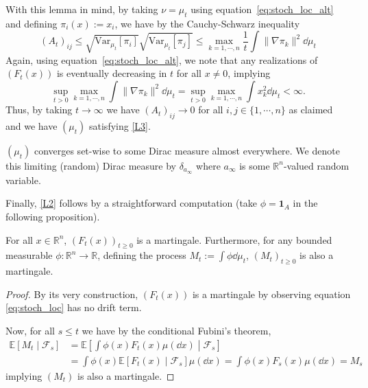 With this lemma in mind, by taking \(\nu = \mu_t\) using 
equation~\eqref{eq:stoch_loc_alt} and defining
\(\pi_i(x) := x_i\), we have by the Cauchy-Schwarz inequality
\[(A_t)_{ij} \le \sqrt{\text{Var}_{\mu_t}[\pi_i]}\sqrt{\text{Var}_{\mu_t}[\pi_j]} 
  \le \max_{k = 1, \cdots, n} \frac{1}{t}\int \|\nabla \pi_k\|^2 \dd \mu_t\]
Again, using equation~\eqref{eq:stoch_loc_alt}, we note that any realizations of \((F_t(x))\) is eventually 
decreasing in \(t\) for all \(x \neq 0\), implying 
\[\sup_{t > 0} \max_{k = 1, \cdots, n} \int \|\nabla \pi_k\|^2 \dd \mu_t = 
\sup_{t > 0} \max_{k = 1, \cdots, n} \int x_k^2 \dd \mu_t < \infty.\] 
Thus, by taking \(t \to \infty\) we have \((A_t)_{ij} \to 0\) for all \(i, j \in \{1, \cdots, n\}\) as claimed 
and we have \((\mu_t)\) satisfying \ref{L3}.

\begin{corollary}
  \((\mu_t)\) converges set-wise to some Dirac measure almost everywhere. We denote this 
  limiting (random) Dirac measure by \(\delta_{a_\infty}\) where \(a_\infty\) is some 
  \(\mathbb{R}^n\)-valued random variable.
\end{corollary}

Finally, \ref{L2} follows by a straightforward computation (take \(\phi = \mathbf{1}_A\) in the following 
proposition).

\begin{proposition}
  For all \(x \in \mathbb{R}^n\), \((F_t(x))_{t \ge 0}\) is a martingale. Furthermore, for any 
  bounded measurable \(\phi : \mathbb{R}^n \to \mathbb{R}\), defining the process 
  \(M_t := \int \phi \dd \mu_t\), \((M_t)_{t \ge 0}\) is also a martingale.
\end{proposition}
\begin{proof}
  By its very construction, \((F_t(x))\) is a martingale by observing equation \ref{eq:stoch_loc} has no 
  drift term.
  
  Now, for all \(s \le t\) we have by the conditional Fubini's theorem,
  \begin{align*}
    \mathbb{E}[M_t \mid \mathscr{F}_s] 
    & = \mathbb{E}\left[\int \phi(x) F_t(x) \mu(\dd x) \middle\vert \mathscr{F}_s\right]\\
    & = \int \phi(x) \mathbb{E}[F_t(x) \mid \mathscr{F}_s] \mu(\dd x) 
    = \int \phi(x) F_s(x) \mu(\dd x)
    = M_s
  \end{align*}
  implying \((M_t)\) is also a martingale.
\end{proof}

